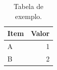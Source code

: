 \begin{table}[htbp]
  \centering
  \caption{Tabela de exemplo.}
  \label{tab:exemplo}
  \begin{tabular}{lr}
    \toprule
    Item & Valor \\
    \midrule
    A & 1 \\
    B & 2 \\
    \bottomrule
  \end{tabular}
\end{table}
